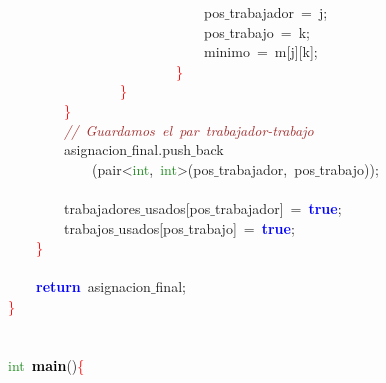 \mbox{}\ \ \ \ \ \ \ \ \ \ \ \ \ \ \ \ \ \ \ \ \ \ \ \ \ \ \ \ pos$\_$trabajador\ \textcolor{BrickRed}{=}\ j\textcolor{BrickRed}{;}\  \\
\mbox{}\ \ \ \ \ \ \ \ \ \ \ \ \ \ \ \ \ \ \ \ \ \ \ \ \ \ \ \ pos$\_$trabajo\ \textcolor{BrickRed}{=}\ k\textcolor{BrickRed}{;}\  \\
\mbox{}\ \ \ \ \ \ \ \ \ \ \ \ \ \ \ \ \ \ \ \ \ \ \ \ \ \ \ \ minimo\ \textcolor{BrickRed}{=}\ m\textcolor{BrickRed}{[}j\textcolor{BrickRed}{][}k\textcolor{BrickRed}{];}\  \\
\mbox{}\ \ \ \ \ \ \ \ \ \ \ \ \ \ \ \ \ \ \ \ \ \ \ \ \textcolor{Red}{\}} \\
\mbox{}\ \ \ \ \ \ \ \ \ \ \ \ \ \ \ \ \textcolor{Red}{\}} \\
\mbox{}\ \ \ \ \ \ \ \ \textcolor{Red}{\}} \\
\mbox{}\ \ \ \ \ \ \ \ \textit{\textcolor{Brown}{//\ Guardamos\ el\ par\ trabajador-trabajo}} \\
\mbox{}\ \ \ \ \ \ \ \ asignacion$\_$final\textcolor{BrickRed}{.}push$\_$back \\
\mbox{}\ \ \ \ \ \ \ \ \ \ \ \ \textcolor{BrickRed}{(}pair\textcolor{BrickRed}{\textless{}}\textcolor{ForestGreen}{int}\textcolor{BrickRed}{,}\ \textcolor{ForestGreen}{int}\textcolor{BrickRed}{\textgreater{}(}pos$\_$trabajador\textcolor{BrickRed}{,}\ pos$\_$trabajo\textcolor{BrickRed}{));} \\
\mbox{} \\
\mbox{}\ \ \ \ \ \ \ \ trabajadores$\_$usados\textcolor{BrickRed}{[}pos$\_$trabajador\textcolor{BrickRed}{]}\ \textcolor{BrickRed}{=}\ \textbf{\textcolor{Blue}{true}}\textcolor{BrickRed}{;}\  \\
\mbox{}\ \ \ \ \ \ \ \ trabajos$\_$usados\textcolor{BrickRed}{[}pos$\_$trabajo\textcolor{BrickRed}{]}\ \textcolor{BrickRed}{=}\ \textbf{\textcolor{Blue}{true}}\textcolor{BrickRed}{;}\  \\
\mbox{}\ \ \ \ \textcolor{Red}{\}} \\
\mbox{} \\
\mbox{}\ \ \ \ \textbf{\textcolor{Blue}{return}}\ asignacion$\_$final\textcolor{BrickRed}{;}\  \\
\mbox{}\textcolor{Red}{\}} \\
\mbox{} \\
\mbox{} \\
\mbox{}\textcolor{ForestGreen}{int}\ \textbf{\textcolor{Black}{main}}\textcolor{BrickRed}{()}\textcolor{Red}{\{} \\
\mbox{} \\
